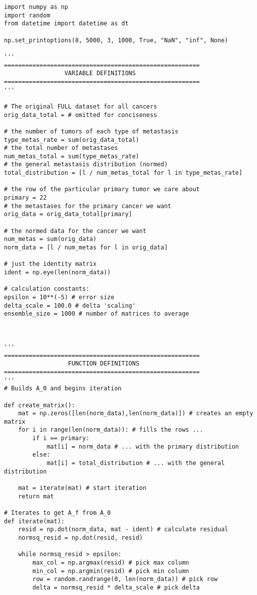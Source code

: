 \documentclass[letterpaper,12pt]{article}
\begin{document}
\begin{verbatim}
import numpy as np
import random
from datetime import datetime as dt

np.set_printoptions(8, 5000, 3, 1000, True, "NaN", "inf", None)

'''
=======================================================
                 VARIABLE DEFINITIONS
=======================================================
'''

# The original FULL dataset for all cancers
orig_data_total = # omitted for conciseness

# the number of tumors of each type of metastasis
type_metas_rate = sum(orig_data_total)
# the total number of metastases
num_metas_total = sum(type_metas_rate)
# the general metastasis distribution (normed)
total_distribution = [l / num_metas_total for l in type_metas_rate]

# the row of the particular primary tumor we care about
primary = 22
# the metastases for the primary cancer we want
orig_data = orig_data_total[primary]

# the normed data for the cancer we want
num_metas = sum(orig_data)
norm_data = [l / num_metas for l in orig_data]

# just the identity matrix
ident = np.eye(len(norm_data))

# calculation constants:
epsilon = 10**(-5) # error size
delta_scale = 100.0 # delta 'scaling'
ensemble_size = 1000 # number of matrices to average



'''
=======================================================
                  FUNCTION DEFINITIONS
=======================================================
'''
# Builds A_0 and begins iteration

def create_matrix():
    mat = np.zeros([len(norm_data),len(norm_data)]) # creates an empty matrix
    for i in range(len(norm_data)): # fills the rows ...
        if i == primary:
            mat[i] = norm_data # ... with the primary distribution
        else:
            mat[i] = total_distribution # ... with the general distribution
        
    mat = iterate(mat) # start iteration
    return mat

# Iterates to get A_f from A_0
def iterate(mat):
    resid = np.dot(norm_data, mat - ident) # calculate residual
    normsq_resid = np.dot(resid, resid)
    
    while normsq_resid > epsilon:
        max_col = np.argmax(resid) # pick max column
        min_col = np.argmin(resid) # pick min column
        row = random.randrange(0, len(norm_data)) # pick row
        delta = normsq_resid * delta_scale # pick delta
        

\end{verbatim}
\end{document}
